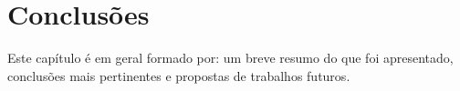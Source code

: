 ﻿%
                      

\chapter{Conclus\~{o}es}\label{CapConclusoes}

Este capítulo é em geral formado por: um breve resumo do que foi apresentado, conclus\~{o}es mais pertinentes e propostas de trabalhos futuros.
